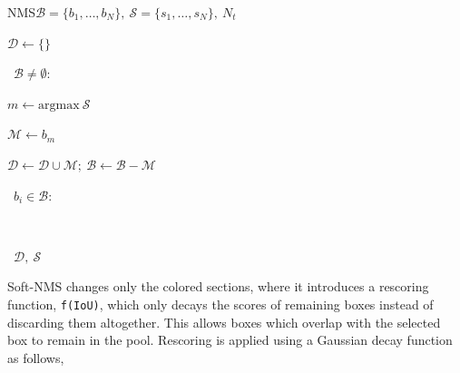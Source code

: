 \begin{pseudofunc}{NMS}{\(\mathcal{B}=\{b_1,\ldots,b_N \},~\mathcal{S}=\{s_1,\ldots,s_N \},~N_t\)}
  \item \(\mathcal{D} \leftarrow \{ \} \)
  \item \pwhile~\(\mathcal{B} \neq \emptyset \):
  \begin{pseudoloop}
    \item \(m \leftarrow \text{argmax}~\mathcal{S}\) 
    \item \(\mathcal{M} \leftarrow b_m\)
    \item \(\mathcal{D} \leftarrow \mathcal{D} \cup \mathcal{M};~ \mathcal{B} \leftarrow \mathcal{B} - \mathcal{M}\)
    \item \pfor~\(b_i \in \mathcal{B}\):
    \vspace{10pt}
    \begin{pseudoloop}
      \vspace{5pt}\\
    \end{pseudoloop}
  \end{pseudoloop}\vspace{5pt}
  \item \pret~\(\mathcal{D},~\mathcal{S}\)
\end{pseudofunc}
%
Soft-NMS changes only the colored sections, where it introduces a rescoring function, \texttt{f(IoU)}, which only decays the scores of remaining boxes instead of discarding them altogether. %
This allows boxes which overlap with the selected box to remain in the pool.
Rescoring is applied using a Gaussian decay function as follows,

